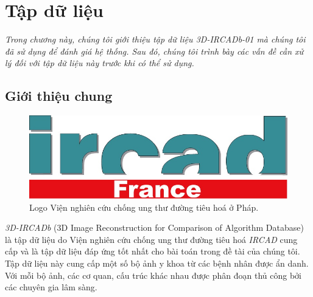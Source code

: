\chapter{Tập dữ liệu}
\label{chap:tap_du_lieu}
	\textit{Trong chương này, chúng tôi giới thiệu tập dữ liệu 3D-IRCADb-01 mà chúng tôi đã sử dụng để đánh giá hệ thống. Sau đó, chúng tôi trình bày các vấn đề cần xử lý đối với tập dữ liệu này trước khi có thể sử dụng.}
\minitoc

\section{Giới thiệu chung}
\label{sec:gioi_thieu_chung}
	\begin{figure}[h!]
		\centering
		\includegraphics[width=.4\textwidth]{figures/ircad_logo}
		\caption{Logo Viện nghiên cứu chống ung thư đường tiêu hoá ở Pháp.}
		\label{fig:3d_ircadb_01_visualize}
	\end{figure}
	\textit{3D-IRCADb} (3D Image Reconstruction for Comparison of Algorithm Database) là tập dữ liệu do Viện nghiên cứu chống ung thư đường tiêu hoá \textit{IRCAD} cung cấp và là tập dữ liệu đáp ứng tốt nhất cho bài toán trong đề tài của chúng tôi. Tập dữ liệu này cung cấp một số bộ ảnh y khoa từ các bệnh nhân được ẩn danh. Với mỗi bộ ảnh, các cơ quan, cấu trúc khác nhau được phân đoạn thủ công bởi các chuyên gia lâm sàng.
	
